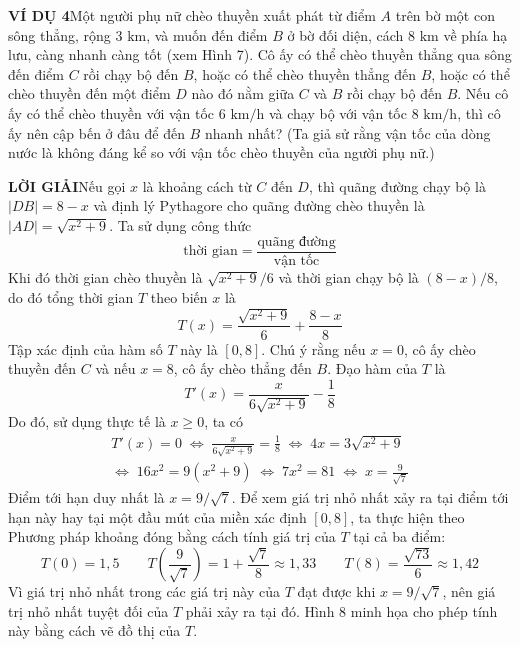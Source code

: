 \documentclass[10pt]{article}
\begin{document}
\begin{minipage}[t]{121mm}
\vspace{0pt}
{\bfseries\color{stewartblue}VÍ DỤ 4}\quad Một người phụ nữ chèo thuyền xuất phát từ điểm $A$ trên bờ một con sông thẳng, rộng $3\text{ km}$, và muốn đến điểm $B$ ở bờ đối diện, cách $8\text{ km}$ về phía hạ lưu, càng nhanh càng tốt (xem Hình 7). Cô ấy có thể chèo thuyền thẳng qua sông đến điểm $C$ rồi chạy bộ đến $B$, hoặc có thể chèo thuyền thẳng đến $B$, hoặc có thể chèo thuyền đến một điểm $D$ nào đó nằm giữa $C$ và $B$ rồi chạy bộ đến $B$. Nếu cô ấy có thể chèo thuyền với vận tốc $6\text{ km/h}$ và chạy bộ với vận tốc $8\text{ km/h}$, thì cô ấy nên cập bến ở đâu để đến $B$ nhanh nhất? (Ta giả sử rằng vận tốc của dòng nước là không đáng kể so với vận tốc chèo thuyền của người phụ nữ.)
\par\vspace{7pt}
{\bfseries\color{stewartblue}LỜI GIẢI}\quad Nếu gọi $x$ là khoảng cách từ $C$ đến $D$, thì quãng đường chạy bộ là $|DB| = 8 - x$ và định lý Pythagore cho quãng đường chèo thuyền là $|AD| = \sqrt{x^2 + 9}$. Ta sử dụng công thức
\[
\text{thời gian} = \frac{\text{quãng đường}}{\text{vận tốc}}
\]
Khi đó thời gian chèo thuyền là $\sqrt{x^2 + 9}/6$ và thời gian chạy bộ là $(8 - x)/8$, do đó tổng thời gian $T$ theo biến $x$ là
\[
T(x) = \frac{\sqrt{x^2 + 9}}{6} + \frac{8 - x}{8}
\]
Tập xác định của hàm số $T$ này là $[0, 8]$. Chú ý rằng nếu $x = 0$, cô ấy chèo thuyền đến $C$ và nếu $x = 8$, cô ấy chèo thẳng đến $B$. Đạo hàm của $T$ là
\[
T'(x) = \frac{x}{6\sqrt{x^2 + 9}} - \frac{1}{8}
\]
Do đó, sử dụng thực tế là $x \geqslant 0$, ta có
\begin{gather*}
T'(x) = 0 \;\iff\; \frac{x}{6\sqrt{x^2 + 9}} = \frac{1}{8} \;\iff\; 4x = 3\sqrt{x^2 + 9}\\[4pt]
\iff\; 16x^2 = 9(x^2 + 9) \;\iff\; 7x^2 = 81 \;\iff\; x = \frac{9}{\sqrt{7}}
\end{gather*}
Điểm tới hạn duy nhất là $x = 9/\sqrt{7}$. Để xem giá trị nhỏ nhất xảy ra tại điểm tới hạn này hay tại một đầu mút của miền xác định $[0, 8]$, ta thực hiện theo Phương pháp khoảng đóng bằng cách tính giá trị của $T$ tại cả ba điểm:
\[
T(0) = 1{,}5 \qquad T\left(\frac{9}{\sqrt{7}}\right) = 1 + \frac{\sqrt{7}}{8} \approx 1{,}33 \qquad T(8) = \frac{\sqrt{73}}{6} \approx 1{,}42
\]
Vì giá trị nhỏ nhất trong các giá trị này của $T$ đạt được khi $x = 9/\sqrt{7}$, nên giá trị nhỏ nhất tuyệt đối của $T$ phải xảy ra tại đó. Hình 8 minh họa cho phép tính này bằng cách vẽ đồ thị của $T$.
\par\vspace{4pt}

\end{minipage}
\end{document}
